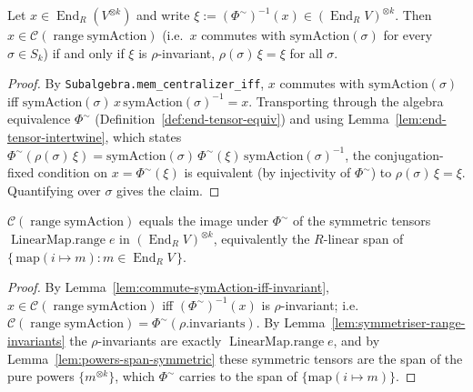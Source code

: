 \begin{lemma}
    \label{lem:commute-symAction-iff-invariant}
    Let $x \in \operatorname{End}_R(V^{\otimes k})$ and write $\xi := (\Phi^{\sim})^{-1}(x) \in
    (\operatorname{End}_R V)^{\otimes k}$. Then $x \in \mathcal{C}(\operatorname{range}\mathrm{symAction})$
    (i.e.\ $x$ commutes with $\mathrm{symAction}(\sigma)$ for every $\sigma \in S_k$) if and only if
    $\xi$ is $\rho$-invariant, $\rho(\sigma)\,\xi = \xi$ for all $\sigma$.
\end{lemma}
\begin{proof}
    By \texttt{Subalgebra.mem\_centralizer\_iff}, $x$ commutes with $\mathrm{symAction}(\sigma)$ iff
    $\mathrm{symAction}(\sigma)\,x\,\mathrm{symAction}(\sigma)^{-1} = x$. Transporting through the algebra
    equivalence $\Phi^{\sim}$ (Definition~\ref{def:end-tensor-equiv}) and using
    Lemma~\ref{lem:end-tensor-intertwine}, which states $\Phi^{\sim}(\rho(\sigma)\,\xi) =
    \mathrm{symAction}(\sigma)\,\Phi^{\sim}(\xi)\,\mathrm{symAction}(\sigma)^{-1}$, the conjugation-fixed
    condition on $x = \Phi^{\sim}(\xi)$ is equivalent (by injectivity of $\Phi^{\sim}$) to
    $\rho(\sigma)\,\xi = \xi$. Quantifying over $\sigma$ gives the claim.
\end{proof}

\begin{lemma}
    \label{lem:centralizer-sym-eq-symmetric}
    \leanok
    $\mathcal{C}(\operatorname{range}\mathrm{symAction})$ equals the image under $\Phi^{\sim}$ of the
    symmetric tensors $\operatorname{LinearMap.range} e$ in $(\operatorname{End}_R V)^{\otimes k}$,
    equivalently the $R$-linear span of
    $\{\, \mathrm{map}(i \mapsto m) : m \in \operatorname{End}_R V \,\}$.
\end{lemma}
\begin{proof}
    By Lemma~\ref{lem:commute-symAction-iff-invariant}, $x \in \mathcal{C}(\operatorname{range}
    \mathrm{symAction})$ iff $(\Phi^{\sim})^{-1}(x)$ is $\rho$-invariant; i.e.\
    $\mathcal{C}(\operatorname{range}\mathrm{symAction}) = \Phi^{\sim}(\rho.\mathrm{invariants})$. By
    Lemma~\ref{lem:symmetriser-range-invariants} the $\rho$-invariants are exactly
    $\operatorname{LinearMap.range} e$, and by Lemma~\ref{lem:powers-span-symmetric} these symmetric
    tensors are the span of the pure powers $\{m^{\otimes k}\}$, which $\Phi^{\sim}$ carries to the span of
    $\{\mathrm{map}(i \mapsto m)\}$.
\end{proof}

